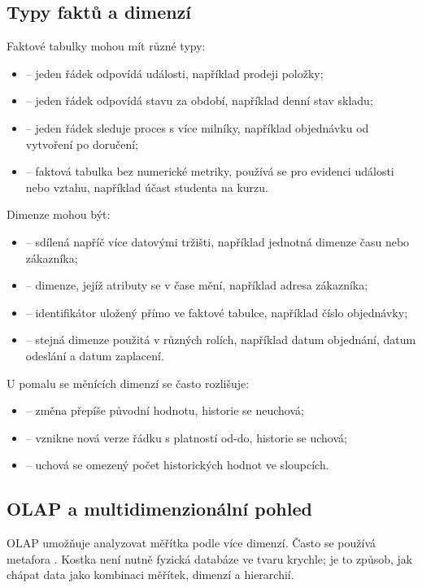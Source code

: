 \subsection{Typy faktů a dimenzí}
Faktové tabulky mohou mít různé typy:
\begin{itemize}
  \item {} -- jeden řádek odpovídá události, například prodeji položky;
  \item {} -- jeden řádek odpovídá stavu za období, například denní stav skladu;
  \item {} -- jeden řádek sleduje proces s více milníky, například objednávku od vytvoření po doručení;
  \item {} -- faktová tabulka bez numerické metriky, používá se pro evidenci události nebo vztahu, například účast studenta na kurzu.
\end{itemize}

Dimenze mohou být:
\begin{itemize}
  \item {} -- sdílená napříč více datovými tržišti, například jednotná dimenze času nebo zákazníka;
  \item {} -- dimenze, jejíž atributy se v čase mění, například adresa zákazníka;
  \item {} -- identifikátor uložený přímo ve faktové tabulce, například číslo objednávky;
  \item {} -- stejná dimenze použitá v různých rolích, například datum objednání, datum odeslání a datum zaplacení.
\end{itemize}

U pomalu se měnících dimenzí se často rozlišuje:
\begin{itemize}
  \item {} -- změna přepíše původní hodnotu, historie se neuchová;
  \item {} -- vznikne nová verze řádku s platností od-do, historie se uchová;
  \item {} -- uchová se omezený počet historických hodnot ve sloupcích.
\end{itemize}

\subsection{OLAP a multidimenzionální pohled}
OLAP umožňuje analyzovat měřítka podle více dimenzí. Často se používá metafora . Kostka není nutně fyzická databáze ve tvaru krychle; je to způsob, jak chápat data jako kombinaci měřítek, dimenzí a hierarchií.

